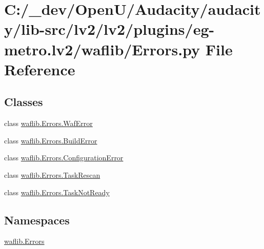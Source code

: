 \hypertarget{lv2_2plugins_2eg-metro_8lv2_2waflib_2_errors_8py}{}\section{C\+:/\+\_\+dev/\+Open\+U/\+Audacity/audacity/lib-\/src/lv2/lv2/plugins/eg-\/metro.lv2/waflib/\+Errors.py File Reference}
\label{lv2_2plugins_2eg-metro_8lv2_2waflib_2_errors_8py}
\subsection*{Classes}
\begin{DoxyCompactItemize}
\item 
class \hyperlink{classwaflib_1_1_errors_1_1_waf_error}{waflib.\+Errors.\+Waf\+Error}
\item 
class \hyperlink{classwaflib_1_1_errors_1_1_build_error}{waflib.\+Errors.\+Build\+Error}
\item 
class \hyperlink{classwaflib_1_1_errors_1_1_configuration_error}{waflib.\+Errors.\+Configuration\+Error}
\item 
class \hyperlink{classwaflib_1_1_errors_1_1_task_rescan}{waflib.\+Errors.\+Task\+Rescan}
\item 
class \hyperlink{classwaflib_1_1_errors_1_1_task_not_ready}{waflib.\+Errors.\+Task\+Not\+Ready}
\end{DoxyCompactItemize}
\subsection*{Namespaces}
\begin{DoxyCompactItemize}
\item 
 \hyperlink{namespacewaflib_1_1_errors}{waflib.\+Errors}
\end{DoxyCompactItemize}

